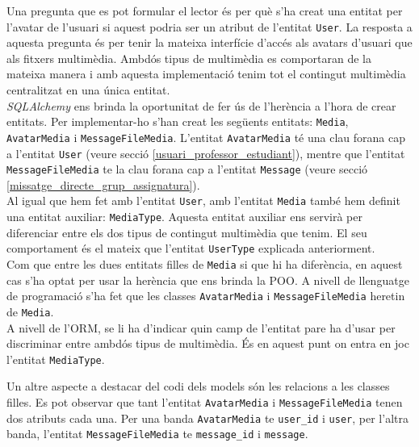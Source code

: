 	Una pregunta que es pot formular el lector és per què s'ha creat una entitat per l'avatar de l'usuari si aquest podria ser un atribut de l'entitat \texttt{User}. La resposta a aquesta pregunta és per tenir la mateixa interfície d'accés als avatars d'usuari que als fitxers multimèdia. Ambdós tipus de multimèdia es comportaran de la mateixa manera i amb aquesta implementació tenim tot el contingut multimèdia centralitzat en una única entitat.	\\
	
	\emph{SQLAlchemy} ens brinda la oportunitat de fer ús de l'herència a l'hora de crear entitats. Per implementar-ho s'han creat les següents entitats: \texttt{Media}, \texttt{AvatarMedia} i \texttt{MessageFileMedia}. L'entitat \texttt{AvatarMedia} té una clau forana cap a l'entitat \texttt{User} (veure secció \ref{usuari_professor_estudiant}), mentre que l'entitat \texttt{MessageFileMedia} te la clau forana cap a l'entitat \texttt{Message} (veure secció \ref{missatge_directe_grup_assignatura}). \\
	
    Al igual que hem fet amb l'entitat \texttt{User}, amb l'entitat \texttt{Media} també hem definit una entitat auxiliar: \texttt{MediaType}. Aquesta entitat auxiliar ens servirà per diferenciar entre els dos tipus de contingut multimèdia que tenim. El seu comportament és el mateix que l'entitat \texttt{UserType} explicada anteriorment.\\
    
    Com que entre les dues entitats filles de \texttt{Media} si que hi ha diferència, en aquest cas s'ha optat per usar la herència que ens brinda la \ac{POO}. A nivell de llenguatge de programació s'ha fet que les classes \texttt{AvatarMedia} i \texttt{MessageFileMedia} heretin de \texttt{Media}.\\
    
     A nivell de l'\ac{ORM}, se li ha d'indicar quin camp de l'entitat pare ha d'usar per discriminar entre ambdós tipus de multimèdia. És en aquest punt on entra en joc l'entitat \texttt{MediaType}.
    
    Un altre aspecte a destacar del codi dels models són les relacions a les classes filles. Es pot observar que tant l'entitat \texttt{AvatarMedia} i \texttt{MessageFileMedia} tenen dos atributs cada una. Per una banda \texttt{AvatarMedia} te \texttt{user\_id} i \texttt{user}, per l'altra banda, l'entitat \texttt{MessageFileMedia} te \texttt{message\_id} i \texttt{message}. \\
    
